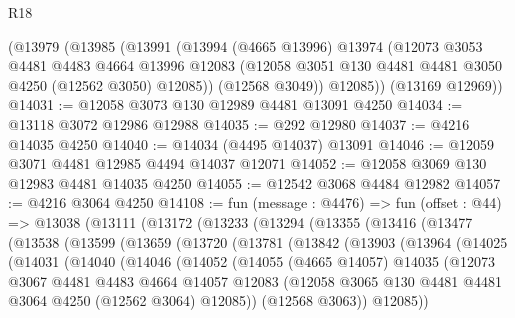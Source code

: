 \begin{lexlean}{R18}
\begin{coremodule}
    (@13979
      (@13985
        (@13991
          (@13994
            (@4665 @13996)
            @13974
            (@12073
              @3053
              @4481
              @4483
              @4664
              @13996
              @12083
              (@12058 @3051 @130 @4481 @4481 @3050 @4250 (@12562 @3050) @12085))
            (@12568 @3049))
          @12085))
      (@13169 @12969))
@14031 := @12058 @3073 @130 @12989 @4481 @13091 @4250
@14034 := @13118 @3072 @12986 @12988
@14035 := @292 @12980
@14037 := @4216 @14035 @4250
@14040 := @14034 (@4495 @14037) @13091
@14046 := @12059 @3071 @4481 @12985 @4494 @14037 @12071
@14052 := @12058 @3069 @130 @12983 @4481 @14035 @4250
@14055 := @12542 @3068 @4484 @12982
@14057 := @4216 @3064 @4250
@14108 := fun (message : @4476) =>
  fun (offset : @44) =>
  @13038
    (@13111
      (@13172
        (@13233
          (@13294
            (@13355
              (@13416
                (@13477
                  (@13538
                    (@13599
                      (@13659
                        (@13720
                          (@13781
                            (@13842
                              (@13903
                                (@13964
                                  (@14025
                                    (@14031
                                      (@14040
                                        (@14046
                                          (@14052
                                            (@14055
                                              (@4665 @14057)
                                              @14035
                                              (@12073
                                                @3067
                                                @4481
                                                @4483
                                                @4664
                                                @14057
                                                @12083
                                                (@12058
                                                  @3065
                                                  @130
                                                  @4481
                                                  @4481
                                                  @3064
                                                  @4250
                                                  (@12562 @3064)
                                                  @12085))
                                              (@12568 @3063))
                                            @12085))

\end{coremodule}
\end{lexlean}
